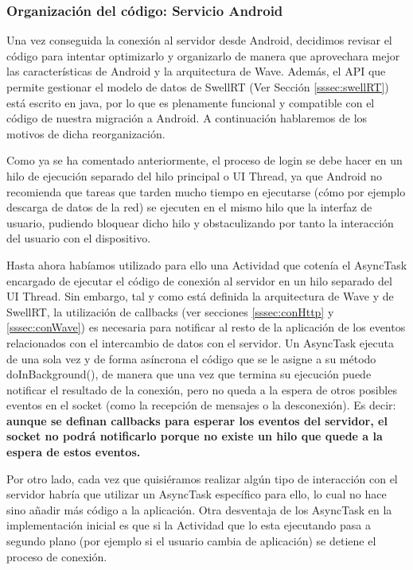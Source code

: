     		\subsubsection{Organización del código: Servicio Android}\label{sssec:orgCodServAnd}
    
    Una vez conseguida la conexión al servidor desde Android, decidimos revisar el código para intentar optimizarlo y organizarlo de manera que aprovechara mejor las características de Android y la arquitectura de Wave. Además, el API que permite gestionar el modelo de datos de SwellRT (Ver Sección \ref{sssec:swellRT}) está escrito en java, por lo que es plenamente funcional y compatible con el código de nuestra migración a Android. A continuación hablaremos de los motivos de dicha reorganización.
  
    Como ya se ha comentado anteriormente, el proceso de login se debe hacer en un hilo de ejecución separado del hilo principal o UI Thread, ya que Android no recomienda\cite{ref:android_processes} que tareas que tarden mucho tiempo en ejecutarse (cómo por ejemplo descarga de datos de la red) se ejecuten en el mismo hilo que la interfaz de usuario, pudiendo bloquear dicho hilo y obstaculizando por tanto la interacción del usuario con el dispositivo.
      
    Hasta ahora habíamos utilizado para ello una Actividad que cotenía el AsyncTask \cite{ref:android_asynctask} encargado de ejecutar el código de conexión al servidor en un hilo separado del UI Thread. Sin embargo, tal y como está definida la arquitectura de Wave y de SwellRT, la utilización de callbacks (ver secciones \ref{sssec:conHttp} y \ref{sssec:conWave}) es necesaria para notificar al resto de la aplicación de los eventos relacionados con el intercambio de datos con el servidor. Un AsyncTask ejecuta de una sola vez y de forma asíncrona el código que se le asigne a su método doInBackground(), de manera que una vez que termina su ejecución puede notificar el resultado de la conexión, pero no queda a la espera de otros posibles eventos en el socket (como la recepción de mensajes o la desconexión). Es decir: \textbf{aunque se definan callbacks para esperar los eventos del servidor, el socket no podrá notificarlo porque no existe un hilo que quede a la espera de estos eventos.}

    Por otro lado, cada vez que quisiéramos realizar algún tipo de interacción con el servidor habría que utilizar un AsyncTask específico para ello, lo cual no hace sino añadir más código a la aplicación. Otra desventaja de los AsyncTask en la implementación inicial es que si la Actividad que lo esta ejecutando pasa a segundo plano (por ejemplo si el usuario cambia de aplicación) se detiene el proceso de conexión. 


